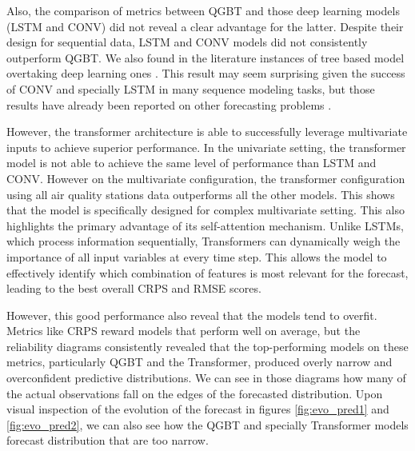 \documentclass[12pt,a4paper]{book}
\begin{document}
Also, the comparison of metrics between QGBT and those deep learning models (LSTM and CONV) did not reveal a clear advantage for the latter. Despite their design for sequential data, LSTM and CONV models did not consistently outperform QGBT. We also found in the literature instances of tree based model overtaking deep learning ones \citep{wesselkamp_advances_2025}. This result may seem surprising given the success of CONV and specially LSTM in many sequence modeling tasks, but those results have already been reported on other forecasting problems \citep{wesselkamp_advances_2025}.

However, the transformer architecture is able to successfully leverage multivariate inputs to achieve superior performance. In the univariate setting, the transformer model is not able to achieve the same level of performance than LSTM and CONV. However on the multivariate configuration, the transformer configuration using all air quality stations data outperforms all the other models. This shows that the model is specifically designed for complex multivariate setting. This also highlights the primary advantage of its self-attention mechanism. Unlike LSTMs, which process information sequentially, Transformers can dynamically weigh the importance of all input variables at every time step. This allows the model to effectively identify which combination of features is most relevant for the \no{} forecast, leading to the best overall CRPS and RMSE scores.

However, this good performance also reveal that the models tend to overfit. Metrics like CRPS reward models that perform well on average, but the reliability diagrams consistently revealed that the top-performing models on these metrics, particularly QGBT and the Transformer, produced overly narrow and overconfident predictive distributions. We can see in those diagrams how many of the actual observations fall on the edges of the forecasted distribution. Upon visual inspection of the evolution of the forecast in figures \ref{fig:evo_pred1} and \ref{fig:evo_pred2}, we can also see how the QGBT and specially Transformer models forecast distribution that are too narrow. 
\end{document}
